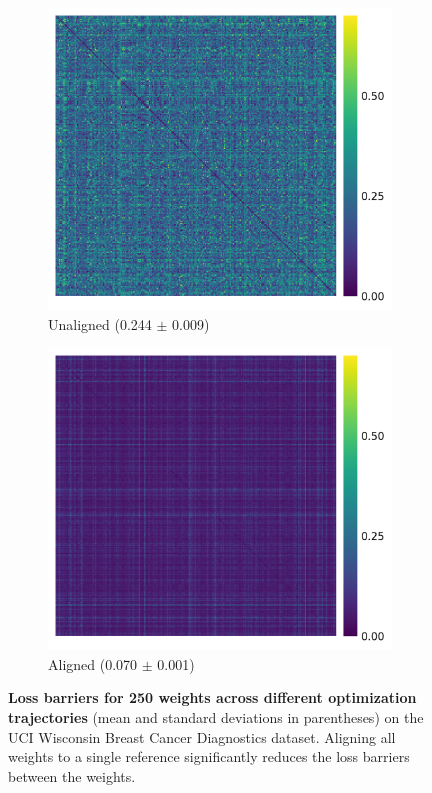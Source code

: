 \begin{figure}[t!]
    \centering
    \begin{subfigure}{0.47\linewidth}
        \centering
        \includegraphics[width=\linewidth]{figures/uci_17/uci_17_unaligned.png}
        \caption{Unaligned (0.244 $\pm$ 0.009)}
        \label{fig:uci_unaligned}
    \end{subfigure}
    \begin{subfigure}{0.47\linewidth}
        \centering
        \includegraphics[width=\linewidth]{figures/uci_17/uci_17_aligned.png}
        \caption{Aligned (0.070 $\pm$ 0.001)}
        \label{fig:uci_aligned}
    \end{subfigure}
    \caption{\label{fig:uci_alignment}\textbf{Loss barriers for 250 weights across different optimization trajectories} (mean and standard deviations in parentheses) on the UCI Wisconsin Breast Cancer Diagnostics dataset. Aligning all weights to a single reference significantly reduces the loss barriers between the weights. } 
\end{figure}

